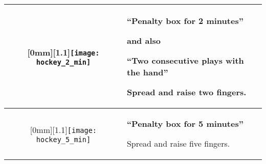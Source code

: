 \begin{longtable}{|c|p{10.8cm}|}
\hline %

\raisebox{-\height}[0mm][1.1\height]{\texttt{[image: hockey\_2\_min]}}
&
\textbf{``Penalty box for 2 minutes''}

and also 

\textbf{``Two consecutive plays with the hand''}

Spread and raise two fingers.\\ 

\hline %

\raisebox{-\height}[0mm][1.1\height]{\texttt{[image: hockey\_5\_min]}}
  &
\textbf{``Penalty box for 5 minutes''}

Spread and raise five fingers.\\

\hline %


\end{longtable}
\renewcommand{\arraystretch}{1}
